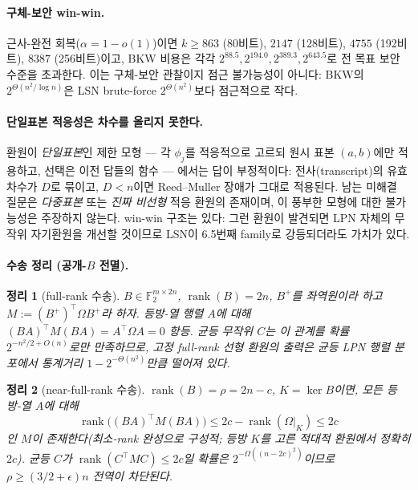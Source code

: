 \documentclass[11pt,a4paper]{article}
\theoremstyle{plain}
\newtheorem{theorem}{정리}[section]
\theoremstyle{definition}
\newcommand{\F}{\mathbb{F}}
\begin{document}
\paragraph{구체-보안 win-win.} 근사-완전 회복($\alpha = 1-o(1)$)이면 $k \ge 863$ (80비트), $2147$ (128비트), $4755$ (192비트), $8387$ (256비트)이고, BKW 비용은 각각 $2^{88.5}, 2^{194.0}, 2^{389.3}, 2^{643.5}$로 전 목표 보안 수준을 초과한다. 이는 구체-보안 관찰이지 점근 불가능성이 아니다: BKW의 $2^{\Theta(n^2/\log n)}$은 LSN brute-force $2^{\Theta(n^2)}$보다 점근적으로 작다.

\paragraph{단일표본 적응성은 차수를 올리지 못한다.} 환원이 \emph{단일표본}인 제한 모형 --- 각 $\phi_j$를 적응적으로 고르되 원시 표본 $(a,b)$에만 적용하고, 선택은 이전 답들의 함수 --- 에서는 답이 부정적이다: 전사(transcript)의 유효 차수가 $D$로 묶이고, $D < n$이면 Reed--Muller 장애가 그대로 적용된다. 남는 미해결 질문은 \emph{다중표본} 또는 \emph{진짜 비선형} 적응 환원의 존재이며, 이 풍부한 모형에 대한 불가능성은 주장하지 않는다. win-win 구조는 있다: 그런 환원이 발견되면 LPN 자체의 무작위 자기환원을 개선할 것이므로 LSN이 6.5번째 family로 강등되더라도 가치가 있다.

\paragraph{수송 정리 (공개-$B$ 전멸).}
\begin{theorem}[full-rank 수송]
$B \in \F_2^{m\times 2n}$, $\operatorname{rank}(B) = 2n$, $B^+$를 좌역원이라 하고 $M := (B^+)^{\!\top}\Omega B^+$라 하자. 등방-열 행렬 $A$에 대해 $(BA)^{\!\top}M(BA) = A^{\!\top}\Omega A = 0$ 항등. 균등 무작위 $C$는 이 관계를 확률 $2^{-n^2/2+O(n)}$로만 만족하므로, 고정 full-rank 선형 환원의 출력은 균등 LPN 행렬 분포에서 통계거리 $1 - 2^{-\Theta(n^2)}$만큼 떨어져 있다.
\end{theorem}

\begin{theorem}[near-full-rank 수송]
$\operatorname{rank}(B) = \rho = 2n - c$, $K = \ker B$이면, 모든 등방-열 $A$에 대해
\[
\operatorname{rank}\bigl((BA)^{\!\top}M(BA)\bigr) \le 2c - \operatorname{rank}(\Omega|_K) \le 2c
\]
인 $M$이 존재한다(최소-rank 완성으로 구성적; 등방 $K$를 고른 적대적 환원에서 정확히 $2c$). 균등 $C$가 $\operatorname{rank}(C^{\!\top}MC) \le 2c$일 확률은 $2^{-\Omega((n-2c)^2)}$이므로 $\rho \ge (3/2+\epsilon)n$ 전역이 차단된다.
\end{theorem}
\end{document}
